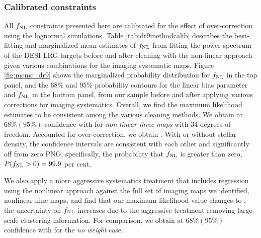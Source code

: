 \subsubsection{Calibrated constraints}
All $f_{\rm NL}$ constraints presented here are calibrated for the effect of over-correction using the lognormal simulations. Table \ref{tab:dr9methodcalib} describes the best-fitting and marginalized mean estimates of $f_{\rm NL}$ from fitting the power spectrum of the DESI LRG targets before and after cleaning with the non-linear approach given various combinations for the imaging systematic maps. Figure \ref{fig:mcmc_dr9} shows the marginalized probability distribution for $f_{\rm NL}$ in the top panel, and the $68\%$ and $95\%$ probability contours for the linear bias parameter and $f_{\rm NL}$ in the bottom panel, from our sample before and after applying various corrections for imaging systematics. Overall, we find the maximum likelihood estimates to be consistent among the various cleaning methods. We obtain  at $68\%(95\%)$ confidence with  for \textit{non-linear three maps} with $34$ degrees of freedom. Accounted for over-correction, we obtain . With or without stellar density, the confidence intervals are consistent with each other and significantly off from zero PNG; specifically, the probability that $f_{\rm NL}$ is greater than zero, $P(f_{\rm NL} >0)=99.9$ per cent. 

We also apply a more aggressive systematics treatment that includes regression using the nonlinear approach against the full set of imaging maps we identified, nonlinear nine maps, and find that  our maximum
likelihood value changes  to ,   the uncertainty on $f_{\rm NL}$ increases  due
to the aggressive treatment removing large-scale clustering information. For comparison, we obtain  at $68\% (95\%)$ confidence with  for the \textit{no weight} case.

